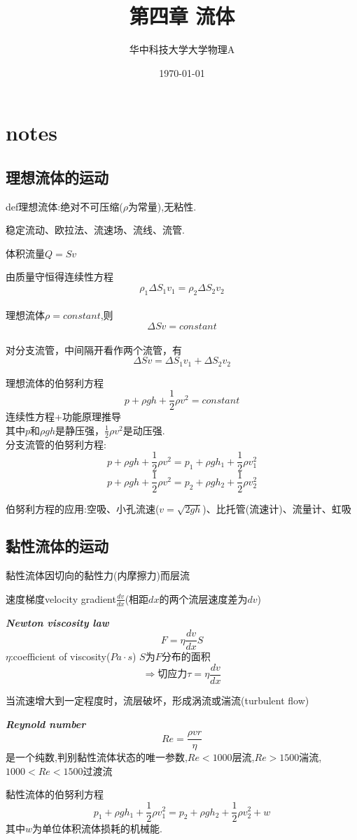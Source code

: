 \documentclass[10pt,a4paper]{article}
\title{第四章 流体}
\author{华中科技大学大学物理A}
\date{\today}
\begin{document}
\maketitle
\section{notes}
\subsection{理想流体的运动}
def理想流体:绝对不可压缩($\rho$为常量),无粘性.

稳定流动、欧拉法、流速场、流线、流管.

体积流量$Q=Sv$

由质量守恒得连续性方程
\[\rho_1\Delta S_1v_1=\rho_2\Delta S_2v_2\]
\\理想流体$\rho=constant$,则
\[\Delta Sv=constant\]
\\对分支流管，中间隔开看作两个流管，有
\[\Delta Sv=\Delta S_1v_1+\Delta S_2v_2\]

理想流体的伯努利方程
\[\boxed{p+\rho gh+\frac{1}{2}\rho v^2=constant}\]
连续性方程+功能原理推导
\\其中$p$和$\rho gh$是静压强，$\frac{1}{2}\rho v^2$是动压强.
\\分支流管的伯努利方程:
\[p+\rho gh+\frac{1}{2}\rho v^2=p_1+\rho gh_1+\frac{1}{2}\rho v_1^2\]
\[p+\rho gh+\frac{1}{2}\rho v^2=p_2+\rho gh_2+\frac{1}{2}\rho v_2^2\]

伯努利方程的应用:空吸、小孔流速($v=\sqrt{2gh}$)、比托管(流速计)、流量计、虹吸
\subsection{黏性流体的运动}
黏性流体因切向的黏性力(内摩擦力)而层流

速度梯度velocity gradient$\frac{dv}{dx}$(相距$dx$的两个流层速度差为$dv$)

\textbf{\textit{Newton viscosity law}}
\[\boxed{F=\eta \frac{dv}{dx}S}\]
$\eta$:coefficient of viscosity($Pa\cdot s$)
$S$为$F$分布的面积
\[\Rightarrow \text{切应力}\tau=\eta \frac{dv}{dx}\]

当流速增大到一定程度时，流层破坏，形成涡流或湍流(turbulent flow)

\textbf{\textit{Reynold number}}
\[\boxed{Re=\frac{\rho vr}{\eta}}\]
是一个纯数,判别黏性流体状态的唯一参数,$Re<1000$层流,$Re>1500$湍流,$1000<Re<1500$过渡流

黏性流体的伯努利方程
\[\boxed{p_1+\rho gh_1+\frac{1}{2}\rho v_1^2=p_2+\rho gh_2+\frac{1}{2}\rho v_2^2+w}\]
其中$w$为单位体积流体损耗的机械能.
\end{document}
